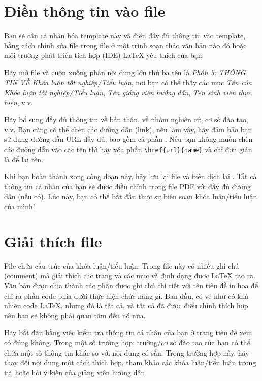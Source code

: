 \section{Điền thông tin vào file }\label{FillingFile}

Bạn sẽ cần cá nhân hóa template này và điền đầy đủ thông tin vào template, bằng cách chỉnh sửa file  trong file ở một trình soạn thảo văn bản nào đó hoặc môi trường phát triển tích hợp (IDE) \LaTeX{} yêu thích của bạn.

Hãy mở file  và cuộn xuống phần nội dung lớn thứ ba tên là \emph{Phần 5: THÔNG TIN VỀ Khóa luận tốt nghiệp/Tiểu luận}, nơi bạn có thể thấy các mục \emph{Tên của Khóa luận tốt nghiệp/Tiểu luận}, \emph{Tên giảng viên hướng dẫn}, \emph{Tên sinh viên thực hiện}, v.v.

Hãy bổ sung đầy đủ thông tin về bản thân, về nhóm nghiên cứ, cơ sở đào tạo, v.v. Bạn cũng có thể chèn các đường dẫn (link), nếu làm vậy, hãy đảm bảo bạn sử dụng đường dẫn URL đầy đủ, bao gồm cả phần . Nếu bạn không muốn chèn các đường dẫn vào các tên thì hãy xóa phần \verb|\href{url}{name}| và chỉ đơn giản là để lại tên.

Khi bạn hoàn thành xong công đoạn này, hãy lưu lại file và biên dịch lại . Tất cả thông tin cá nhân của bạn sẽ được điều chỉnh trong file PDF với đầy đủ đường dẫn (nếu có). Lúc này, bạn có thể bắt đầu thực sự biên soạn khóa luận/tiểu luận của mình!



\section{Giải thích file }

File  chứa cấu trúc của khóa luận/tiểu luận. Trong file này có nhiều ghi chú (comment) mà giải thích các trang và các mục và định dạng được \LaTeX{} tạo ra. Văn bản được chia thành các phần được ghi chú chi tiết với tên tiêu đề in hoa để chỉ ra phần code phía dưới thực hiện chức năng gì. Ban đầu, có vẻ như có khá nhiều code \LaTeX{}, nhưng đó là tất cả, và tất cả đã được điều chỉnh thích hợp nên bạn sẽ không phải quan tâm đến nó nữa.

Hãy bắt đầu bằng việc kiểm tra thông tin cá nhân của bạn ở trang tiêu đề xem có đúng không. Trong một số trường hợp, trường/cơ sở đào tạo của bạn có thể chứa một số thông tin khác so với nội dung có sẵn. Trong trường hợp này, hãy thay đổi nội dung một cách thích hợp, tham khảo các khóa luận/tiểu luận tương tự, hoặc hỏi ý kiến của giảng viên hướng dẫn.

